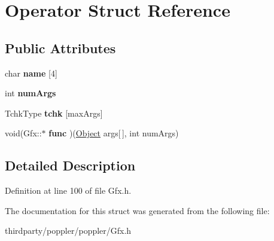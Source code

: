 \hypertarget{struct_operator}{}\section{Operator Struct Reference}
\label{struct_operator}
\subsection*{Public Attributes}
\begin{DoxyCompactItemize}
\item 
\mbox{\label{struct_operator_a6df0197a369cffffc1984289ff4389a0}} 
char {\bfseries name} \mbox{[}4\mbox{]}
\item 
\mbox{\label{struct_operator_a73080a6cdedd16bf74c30d6e5d3c38ab}} 
int {\bfseries num\+Args}
\item 
\mbox{\label{struct_operator_aa4cc642a9c1b90986d3756e9ed476d8e}} 
Tchk\+Type {\bfseries tchk} \mbox{[}max\+Args\mbox{]}
\item 
\mbox{\label{struct_operator_a5a369300a485c4edc17b8f4688d67acc}} 
void(Gfx\+::$\ast$ {\bfseries func} )(\hyperlink{class_object}{Object} args\mbox{[}$\,$\mbox{]}, int num\+Args)
\end{DoxyCompactItemize}


\subsection{Detailed Description}


Definition at line 100 of file Gfx.\+h.



The documentation for this struct was generated from the following file\+:\begin{DoxyCompactItemize}
\item 
thirdparty/poppler/poppler/Gfx.\+h\end{DoxyCompactItemize}
